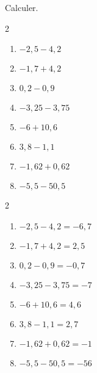 \begin{exercice*}
    Calculer.
    \begin{multicols}2
        \begin{enumerate}
            \item $ -2,5-4,2 $
            \item $ -1,7+4,2 $
            \item $ 0,2-0,9 $
            \item $ -3,25-3,75 $
            \item $ -6+10,6 $
            \item $ 3,8-1,1 $
            \item $ -1,62+0,62 $
            \item $ -5,5-50,5 $
        \end{enumerate}
    \end{multicols}    
\end{exercice*}
\begin{corrige}
    \phantom{rrr}    
    \begin{multicols}2
        \begin{enumerate}
            \item $ -2,5-4,2 = -6,7$
            \item $ -1,7+4,2 = 2,5$
            \item $ 0,2-0,9 = -0,7$
            \item $ -3,25-3,75 = -7$
            \item $ -6+10,6 = 4,6$
            \item $ 3,8-1,1 = 2,7$
            \item $ -1,62+0,62 = -1$
            \item $ -5,5-50,5 = -56$
        \end{enumerate}
    \end{multicols}
\end{corrige}
